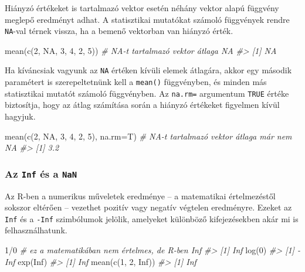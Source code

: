 \documentclass[
]{book}
\newenvironment{Shaded}{\begin{snugshade}}{\end{snugshade}}
\newcommand{\AttributeTok}[1]{\textcolor[rgb]{0.77,0.63,0.00}{#1}}
\newcommand{\CommentTok}[1]{\textcolor[rgb]{0.56,0.35,0.01}{\textit{#1}}}
\newcommand{\ConstantTok}[1]{\textcolor[rgb]{0.00,0.00,0.00}{#1}}
\newcommand{\DecValTok}[1]{\textcolor[rgb]{0.00,0.00,0.81}{#1}}
\newcommand{\FunctionTok}[1]{\textcolor[rgb]{0.00,0.00,0.00}{#1}}
\newcommand{\NormalTok}[1]{#1}
\newcommand{\SpecialCharTok}[1]{\textcolor[rgb]{0.00,0.00,0.00}{#1}}
\begin{document}
Hiányzó értékeket is tartalmazó vektor esetén néhány vektor alapú függvény meglepő eredményt adhat. A statisztikai mutatókat számoló függvények rendre \texttt{NA}-val térnek vissza, ha a bemenő vektorban van hiányzó érték.

\begin{Shaded}
\begin{Highlighting}[]
\FunctionTok{mean}\NormalTok{(}\FunctionTok{c}\NormalTok{(}\DecValTok{2}\NormalTok{, }\ConstantTok{NA}\NormalTok{, }\DecValTok{3}\NormalTok{, }\DecValTok{4}\NormalTok{, }\DecValTok{2}\NormalTok{, }\DecValTok{5}\NormalTok{))  }\CommentTok{\# NA{-}t tartalmazó vektor átlaga NA}
\CommentTok{\#\textgreater{} [1] NA}
\end{Highlighting}
\end{Shaded}

Ha kíváncsiak vagyunk az \texttt{NA} értéken kívüli elemek átlagára, akkor egy második paramétert is szerepeltetnünk kell a \texttt{mean()} függvényben, és minden más statisztikai mutatót számoló függvényben. Az \texttt{na.rm=} argumentum \texttt{TRUE} értéke biztosítja, hogy az átlag számítása során a hiányzó értékeket figyelmen kívül hagyjuk.

\begin{Shaded}
\begin{Highlighting}[]
\FunctionTok{mean}\NormalTok{(}\FunctionTok{c}\NormalTok{(}\DecValTok{2}\NormalTok{, }\ConstantTok{NA}\NormalTok{, }\DecValTok{3}\NormalTok{, }\DecValTok{4}\NormalTok{, }\DecValTok{2}\NormalTok{, }\DecValTok{5}\NormalTok{), }\AttributeTok{na.rm=}\NormalTok{T)  }\CommentTok{\# NA{-}t tartalmazó vektor átlaga már nem NA}
\CommentTok{\#\textgreater{} [1] 3.2}
\end{Highlighting}
\end{Shaded}

\hypertarget{az-inf-uxe9s-a-nan}{%
\subsubsection{\texorpdfstring{Az \texttt{Inf} és a \texttt{NaN}}{Az Inf és a NaN}}\label{az-inf-uxe9s-a-nan}}

Az R-ben a numerikus műveletek eredménye -- a matematikai értelmezéstől sokszor eltérően -- vezethet pozitív vagy negatív végtelen eredményre. Ezeket az \texttt{Inf} és a \texttt{-Inf} szimbólumok jelölik, amelyeket különböző kifejezésekben akár mi is felhasználhatunk.

\begin{Shaded}
\begin{Highlighting}[]
\DecValTok{1}\SpecialCharTok{/}\DecValTok{0}                 \CommentTok{\# ez a matematikában nem értelmes, de R{-}ben Inf}
\CommentTok{\#\textgreater{} [1] Inf}
\FunctionTok{log}\NormalTok{(}\DecValTok{0}\NormalTok{)}
\CommentTok{\#\textgreater{} [1] {-}Inf}
\FunctionTok{exp}\NormalTok{(}\ConstantTok{Inf}\NormalTok{)}
\CommentTok{\#\textgreater{} [1] Inf}
\FunctionTok{mean}\NormalTok{(}\FunctionTok{c}\NormalTok{(}\DecValTok{1}\NormalTok{, }\DecValTok{2}\NormalTok{, }\ConstantTok{Inf}\NormalTok{))}
\CommentTok{\#\textgreater{} [1] Inf}
\end{Highlighting}
\end{Shaded}
\end{document}
